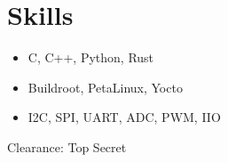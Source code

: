 \section*{Skills}
\begin{itemize}[itemsep=-0.5em]
    \item C, C++, Python, Rust
    \item Buildroot, PetaLinux, Yocto
    \item I2C, SPI, UART, ADC, PWM, IIO
\end{itemize}
\noindent Clearance: Top Secret \par
